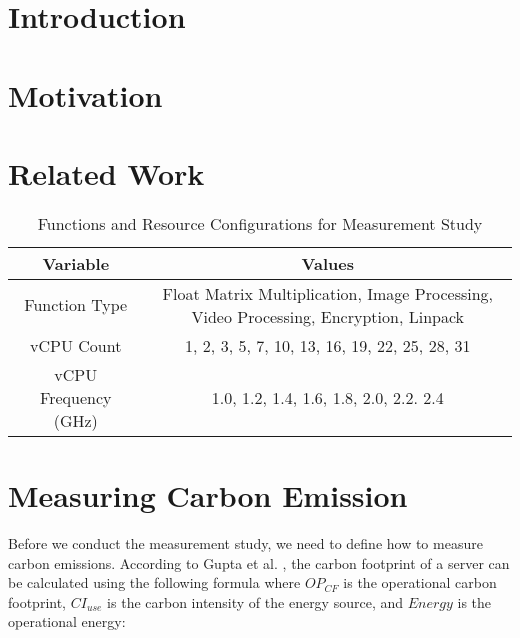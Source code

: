\documentclass[times, 10pt,twocolumn]{article}
\begin{document}
\section{Introduction}


\section{Motivation}

\section{Related Work}

\begin{table*}[htbp]
   \centering
   \begin{tabular}{|c|c|}
   \hline
   \textbf{Variable} & \textbf{Values} \\ \hline
   Function Type & Float Matrix Multiplication, Image Processing, Video Processing, Encryption, Linpack \\ \hline
   vCPU Count & 1, 2, 3, 5, 7, 10, 13, 16, 19, 22, 25, 28, 31 \\ \hline
   vCPU Frequency (GHz) & 1.0, 1.2, 1.4, 1.6, 1.8, 2.0, 2.2. 2.4 \\ \hline
   \end{tabular}
   \caption{Functions and Resource Configurations for Measurement Study}
   \label{tab:mstudy1_configurations}
\end{table*}

\section{Measuring Carbon Emission}


Before we conduct the measurement study, we need to define how to measure carbon emissions. According to Gupta et al. \cite{gupta2022act}, the carbon footprint of a server can be calculated using the following formula where $OP_{CF}$ is the operational carbon footprint, $CI_{use}$ is the carbon intensity of the energy source, and $Energy$ is the operational energy:
\end{document}
